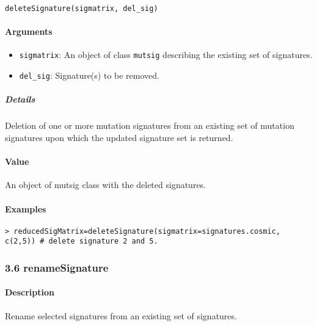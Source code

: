 \documentclass[]{article}
\providecommand{\tightlist}{%
  \setlength{\itemsep}{0pt}\setlength{\parskip}{0pt}}
\let\oldparagraph\paragraph
\renewcommand{\paragraph}[1]{\oldparagraph{#1}\mbox{}}
\let\oldsubparagraph\subparagraph
\renewcommand{\subparagraph}[1]{\oldsubparagraph{#1}\mbox{}}
\begin{document}
\texttt{deleteSignature(sigmatrix,\ del\_sig)}

\paragraph{\texorpdfstring{\textbf{Arguments
}}{Arguments }}\label{arguments-3}

\begin{itemize}
\tightlist
\item
  \texttt{sigmatrix}: An object of class \texttt{mutsig} describing the
  existing set of signatures.
\item
  \texttt{del\_sig}: Signature(s) to be removed.
\end{itemize}

\subparagraph{\texorpdfstring{\textbf{Details}}{Details}}\label{details-3}

Deletion of one or more mutation signatures from an existing set of
mutation signatures upon which the updated signature set is returned.

\paragraph{\texorpdfstring{\textbf{Value}}{Value}}\label{value-2}

An object of mutsig class with the deleted signatures.

\paragraph{\texorpdfstring{\textbf{Examples}}{Examples}}\label{examples-4}

\begin{verbatim}
> reducedSigMatrix=deleteSignature(sigmatrix=signatures.cosmic, c(2,5)) # delete signature 2 and 5.
\end{verbatim}

\subsubsection{3.6 renameSignature}\label{renamesignature}

\paragraph{\texorpdfstring{\textbf{Description}}{Description}}\label{description-5}

Rename selected signatures from an existing set of signatures.
\end{document}
